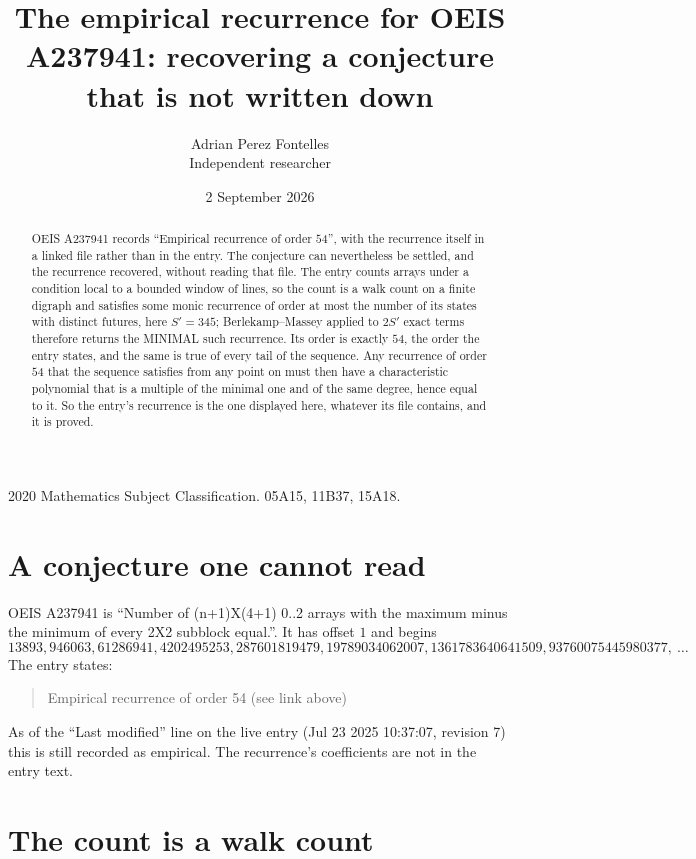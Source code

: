 \documentclass[11pt,a4paper]{article}
\title{The empirical recurrence for OEIS A237941: recovering a conjecture that is not written down}
\author{Adrian Perez Fontelles\\ \small Independent researcher}
\date{2 September 2026}
\theoremstyle{plain}
\theoremstyle{definition}
\begin{document}
\maketitle

\begin{abstract}
OEIS A237941 records ``Empirical recurrence of order $54$'', with the recurrence itself in a
linked file rather than in the entry. The conjecture can nevertheless be settled, and the
recurrence recovered, without reading that file. The entry counts arrays under a condition
local to a bounded window of lines, so the count is a walk count on a finite digraph and
satisfies some monic recurrence of order at most the number of its states with distinct
futures, here $S'=345$; Berlekamp--Massey applied to $2S'$ exact
terms therefore returns the MINIMAL such recurrence. Its order is exactly $54$, the order
the entry states, and the same is true of every tail of the sequence. Any recurrence of order
$54$ that the sequence satisfies from any point on must then have a characteristic
polynomial that is a multiple of the minimal one and of the same degree, hence equal to it. So
the entry's recurrence is the one displayed here, whatever its file contains, and it is
proved.
\end{abstract}

\noindent\small 2020 Mathematics Subject Classification. 05A15, 11B37, 15A18.\normalsize

\section{A conjecture one cannot read}

OEIS A237941 is ``Number of (n+1)X(4+1) 0..2 arrays with the maximum minus the minimum of every 2X2 subblock equal.''. It has offset $1$ and begins
\[
13893, 946063, 61286941, 4202495253, 287601819479, 19789034062007, 1361783640641509, 93760075445980377,\ \dots
\]
The entry states:
\begin{quote}
Empirical recurrence of order 54 (see link above)
\end{quote}
As of the ``Last modified'' line on the live entry (Jul 23 2025 10:37:07, revision 7) this is still
recorded as empirical. The recurrence's coefficients are not in the entry text.

\section{The count is a walk count}
\end{document}
